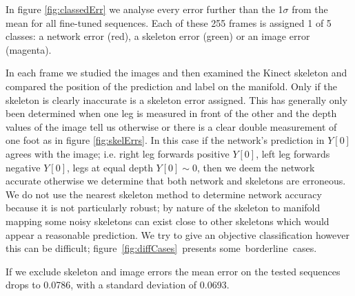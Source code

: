 \documentclass[11pt]{article} %
\begin{document}
In figure \ref{fig:classedErr} we analyse every error further than the 1$\sigma$ from the mean for all fine-tuned sequences. Each of these 255 frames is assigned 1 of 5 classes: a network error (red), a skeleton error (green) or an image error (magenta).

In each frame we studied the images and then examined the Kinect skeleton and compared the position of the prediction and label on the manifold. Only if the skeleton is clearly inaccurate is a skeleton error assigned. This has generally only been determined when one leg is measured in front of the other and the depth values of the image tell us otherwise or there is a clear double measurement of one foot as in figure \ref{fig:skelErrs}. In this case if the network's prediction in $Y[0]$ agrees with the image; i.e. right leg forwards positive $Y[0]$,  left leg forwards negative $Y[0]$, legs at equal depth $Y[0]\sim 0$, then we deem the network accurate otherwise we determine that both network and skeletons are erroneous. We do not use the nearest skeleton method to determine network accuracy because it is not particularly robust; by nature of the skeleton to manifold mapping some noisy skeletons can exist close to other skeletons which would appear a reasonable prediction. We try to give an objective classification however this can be difficult; figure~\ref{fig:diffCases}~presents some~borderline~cases. 

If we exclude skeleton and image errors the mean error on the tested sequences drops to 0.0786, with a standard deviation of 0.0693. 
\end{document}
